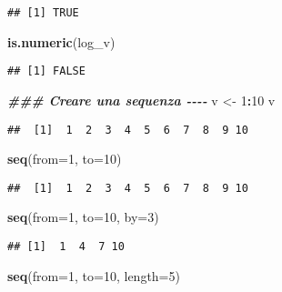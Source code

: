 \documentclass[
]{article}
\newenvironment{Shaded}{\begin{snugshade}}{\end{snugshade}}
\newcommand{\AttributeTok}[1]{\textcolor[rgb]{0.13,0.29,0.53}{#1}}
\newcommand{\DecValTok}[1]{\textcolor[rgb]{0.00,0.00,0.81}{#1}}
\newcommand{\DocumentationTok}[1]{\textcolor[rgb]{0.56,0.35,0.01}{\textbf{\textit{#1}}}}
\newcommand{\FunctionTok}[1]{\textcolor[rgb]{0.13,0.29,0.53}{\textbf{#1}}}
\newcommand{\NormalTok}[1]{#1}
\newcommand{\OtherTok}[1]{\textcolor[rgb]{0.56,0.35,0.01}{#1}}
\newcommand{\SpecialCharTok}[1]{\textcolor[rgb]{0.81,0.36,0.00}{\textbf{#1}}}
\begin{document}
\begin{verbatim}
## [1] TRUE
\end{verbatim}

\begin{Shaded}
\begin{Highlighting}[]
\FunctionTok{is.numeric}\NormalTok{(log\_v)}
\end{Highlighting}
\end{Shaded}

\begin{verbatim}
## [1] FALSE
\end{verbatim}

\begin{Shaded}
\begin{Highlighting}[]
\DocumentationTok{\#\#\# Creare una sequenza {-}{-}{-}{-}}
\NormalTok{v }\OtherTok{\textless{}{-}} \DecValTok{1}\SpecialCharTok{:}\DecValTok{10}
\NormalTok{v}
\end{Highlighting}
\end{Shaded}

\begin{verbatim}
##  [1]  1  2  3  4  5  6  7  8  9 10
\end{verbatim}

\begin{Shaded}
\begin{Highlighting}[]
\FunctionTok{seq}\NormalTok{(}\AttributeTok{from=}\DecValTok{1}\NormalTok{, }\AttributeTok{to=}\DecValTok{10}\NormalTok{)}
\end{Highlighting}
\end{Shaded}

\begin{verbatim}
##  [1]  1  2  3  4  5  6  7  8  9 10
\end{verbatim}

\begin{Shaded}
\begin{Highlighting}[]
\FunctionTok{seq}\NormalTok{(}\AttributeTok{from=}\DecValTok{1}\NormalTok{, }\AttributeTok{to=}\DecValTok{10}\NormalTok{, }\AttributeTok{by=}\DecValTok{3}\NormalTok{)}
\end{Highlighting}
\end{Shaded}

\begin{verbatim}
## [1]  1  4  7 10
\end{verbatim}

\begin{Shaded}
\begin{Highlighting}[]
\FunctionTok{seq}\NormalTok{(}\AttributeTok{from=}\DecValTok{1}\NormalTok{, }\AttributeTok{to=}\DecValTok{10}\NormalTok{, }\AttributeTok{length=}\DecValTok{5}\NormalTok{)}
\end{Highlighting}
\end{Shaded}
\end{document}
